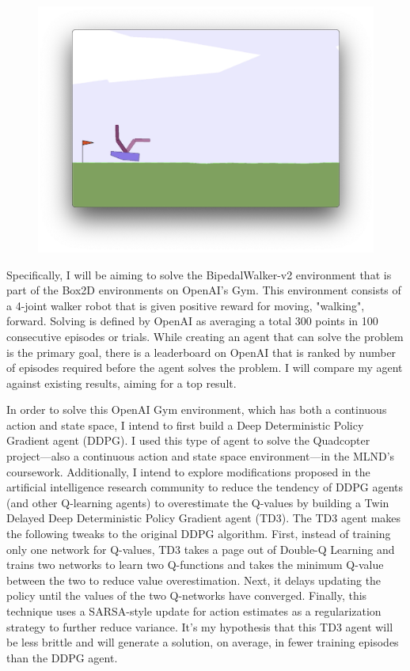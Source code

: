 \documentclass{article}
\begin{document}
\begin{figure}[h]
\includegraphics[scale=0.25]{images/bipedal-fall-upside-down.png}
\end{figure}

Specifically, I will be aiming to solve the BipedalWalker-v2 environment that is part of the Box2D environments on OpenAI's Gym. This environment consists of a 4-joint walker robot that is given positive reward for moving, "walking", forward. Solving is defined by OpenAI as averaging a total 300 points in 100 consecutive episodes or trials. While creating an agent that can solve the problem is the primary goal, there is a leaderboard on OpenAI that is ranked by number of episodes required before the agent solves the problem. I will compare my agent against existing results, aiming for a top result.

In order to solve this OpenAI Gym environment, which has both a continuous action and state space, I intend to first build a Deep Deterministic Policy Gradient agent (DDPG). I used this type of agent to solve the Quadcopter project—also a continuous action and state space environment—in the MLND's coursework. Additionally, I intend to explore modifications proposed in the artificial intelligence research community to reduce the tendency of DDPG agents (and other Q-learning agents) to overestimate the Q-values by building a Twin Delayed Deep Deterministic Policy Gradient agent (TD3). \cite{DBLP:journals/corr/abs-1802-09477} The TD3 agent makes the following tweaks to the original DDPG algorithm. First, instead of training only one network for Q-values, TD3 takes a page out of Double-Q Learning and trains two networks to learn two Q-functions and takes the minimum Q-value between the two to reduce value overestimation. Next, it delays updating the policy until the values of the two Q-networks have converged. Finally, this technique uses a SARSA-style update for action estimates as a regularization strategy to further reduce variance. It's my hypothesis that this TD3 agent will be less brittle and will generate a solution, on average, in fewer training episodes than the DDPG agent.
\end{document}
